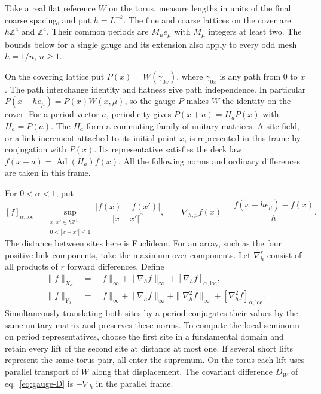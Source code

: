 \documentclass[11pt,letterpaper,reqno]{amsart}
\numberwithin{equation}{section}
\renewcommand{\eqref}[1]{\textup{eq.~\ref{#1}}}
\theoremstyle{definition}
\theoremstyle{remark}
\begin{document}
Take a real flat reference \(W\) on the torus, measure lengths
in units of the final coarse spacing, and put \(h=L^{-k}\).
The fine and coarse lattices on the cover are \(h\mathbb Z^4\)
and \(\mathbb Z^4\). Their common periods are \(M_\mu e_\mu\)
with \(M_\mu\) integers at least two. The bounds below for a
single gauge and its extension also apply to every odd mesh
\(h=1/n\), \(n\geq1\).

On the covering lattice put \(P(x)=W(\gamma_{0x})\), where
\(\gamma_{0x}\) is any path from \(0\) to \(x\). The path
interchange identity and flatness give path independence.
In particular \(P(x+h e_\mu)=P(x)W(x,\mu)\), so the gauge \(P\)
makes \(W\) the identity on the cover. For a period vector
\(a\), periodicity gives \(P(x+a)=H_aP(x)\) with \(H_a=P(a)\).
The \(H_a\) form a commuting family of unitary matrices. A site
field, or a link increment attached to its initial point \(x\),
is represented in this frame by conjugation with \(P(x)\).
Its representative satisfies the deck law
\(f(x+a)=\operatorname{Ad}(H_a)f(x)\). All the following
norms and ordinary differences are taken in this frame.

For \(0<\alpha<1\), put
\[
 [f]_{\alpha,\mathrm{loc}}
 =\sup_{\substack{x,x'\in h\mathbb Z^4\\0<|x-x'|\leq1}}
          \frac{|f(x)-f(x')|}{|x-x'|^\alpha},
 \qquad
 \nabla_{h,\mu} f(x)=\frac{f(x+h e_\mu)-f(x)}h .
\]
The distance between sites here is Euclidean. For an array, such as
the four positive link components, take the maximum over components.
Let \(\nabla_h^r\) consist of all products of \(r\) forward
differences. Define
\begin{equation}\label{eq:smooth-gauge-norms}
 \begin{split}
 \|f\|_{X_\alpha}&=\|f\|_\infty+\|\nabla_h f\|_\infty
                         +[\nabla_h f]_{\alpha,\mathrm{loc}},\\
 \|f\|_{Y_\alpha}&=\|f\|_\infty+\|\nabla_h f\|_\infty
               +\|\nabla_h^2 f\|_\infty
                         +[\nabla_h^2 f]_{\alpha,\mathrm{loc}}.
 \end{split}
\end{equation}
Simultaneously translating both sites by a period conjugates their
values by the same unitary matrix and preserves these norms.
To compute the local seminorm on period representatives, choose the
first site in a fundamental domain and retain every lift of the second
site at distance at most one. If several short lifts represent the
same torus pair, all enter the supremum. On the torus each lift uses
parallel transport of \(W\) along that displacement. The
covariant difference \(D_W\) of \eqref{eq:gauge-D} is
\(-\nabla_h\) in the parallel frame.
\end{document}
